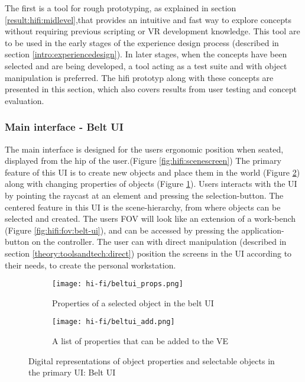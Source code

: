 The first is a tool for rough prototyping, as explained in section \ref{result:hifi:midlevel},that provides an intuitive and fast way to explore concepts without requiring previous scripting or VR development knowledge. This tool are to be used in the early stages of the experience design process (described in section \ref{intro:experiencedesign}). In later stages, when the concepts have been selected and are being developed, a tool acting as a test suite and with object manipulation is preferred. The hifi prototyp along with these concepts are presented in this section, which also covers results from user testing and concept evaluation.
\subsubsection{Main interface - Belt UI}
The main interface is designed for the users ergonomic position when seated, displayed from the hip of the user.(Figure \ref{fig:hifi:scenescreen}) The primary feature of this UI is to create new objects and place them in the world (Figure \ref{fig:hifi:belt-ui:add}) along with changing properties of objects (Figure \ref{fig:hifi:belt-ui:props}). Users interacts with the UI by pointing the raycast at an element and pressing the selection-button. The centered feature in this UI is the scene-hierarchy, from where objects can be selected and created. The users FOV will look like an extension of a work-bench (Figure \ref{fig:hifi:fov:belt-ui}), and can be accessed by pressing the application-button on the controller. The user can with direct manipulation (described in section \ref{theory:toolsandtech:direct}) position the screens in the UI according to their needs, to create the personal workstation.
%
\begin{figure}
\begin{subfigure}{.5\textwidth}
  \centering
  \texttt{[image: hi-fi/beltui\_props.png]}
  \caption{Properties of a selected object in the belt UI}
  \label{fig:hifi:belt-ui:props}
\end{subfigure}%
\begin{subfigure}{.5\textwidth}
  \centering
  \texttt{[image: hi-fi/beltui\_add.png]}
  \caption{A list of properties that can be added to the VE}
  \label{fig:hifi:belt-ui:add}
\end{subfigure}
\caption{Digital representations of object properties and selectable objects in the primary UI: Belt UI}
\label{fig:hifi:belt-ui}
\end{figure}

